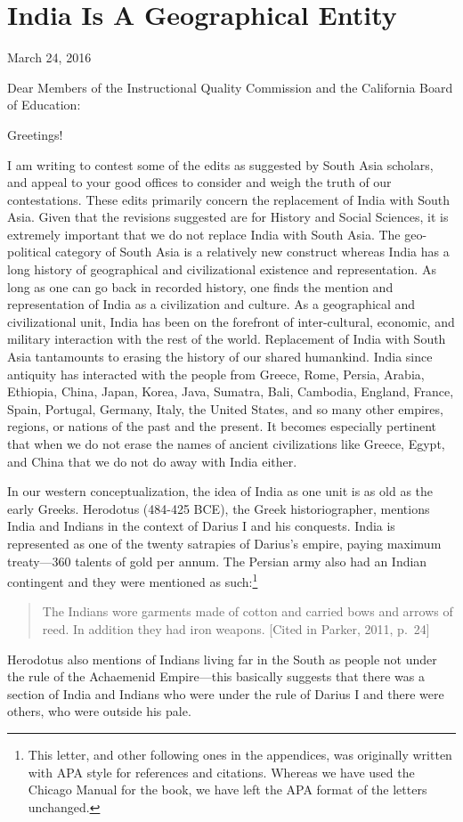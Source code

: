 \chapter{India Is A Geographical Entity}

March 24, 2016

Dear Members of the Instructional Quality Commission and the California Board of Education:

Greetings!

I am writing to contest some of the edits as suggested by South Asia scholars, and appeal to your good offices to consider and weigh the truth of our contestations. These edits primarily concern the replacement of India with South Asia. Given that the revisions suggested are for History and Social Sciences, it is extremely important that we do not replace India with South Asia. The geo-political category of South Asia is a relatively new construct whereas India has a long history of geographical and civilizational existence and representation. As long as one can go back in recorded history, one finds the mention and representation of India as a civilization and culture. As a geographical and civilizational unit, India has been on the forefront of inter-cultural, economic, and military interaction with the rest of the world. Replacement of India with South Asia tantamounts to erasing the history of our shared humankind. India since antiquity has interacted with the people from Greece, Rome, Persia, Arabia, Ethiopia, China, Japan, Korea, Java, Sumatra, Bali, Cambodia, England, France, Spain, Portugal, Germany, Italy, the United States, and so many other empires, regions, or nations of the past and the present. It becomes especially pertinent that when we do not erase the names of ancient civilizations like Greece, Egypt, and China that we do not do away with India either.

In our western conceptualization, the idea of India as one unit is as old as the early Greeks. Herodotus (484-425 BCE), the Greek historiographer, mentions India and Indians in the context of Darius I and his conquests. India is represented as one of the twenty satrapies of Darius’s empire, paying maximum treaty—360 talents of gold per annum. The Persian army also had an Indian contingent and they were mentioned as such:\footnote{This letter, and other following ones in the appendices, was originally written with APA style for references and citations. Whereas we have used the Chicago Manual for the book, we have left the APA format of the letters unchanged.}
\begin{quote}
The Indians wore garments made of cotton and carried bows and arrows of reed. In addition they had iron weapons. [Cited in Parker, 2011, p.\ 24]
\end{quote}
Herodotus also mentions of Indians living far in the South as people not under the rule of the Achaemenid Empire—this basically suggests that there was a section of India and Indians who were under the rule of Darius I and there were others, who were outside his pale.

